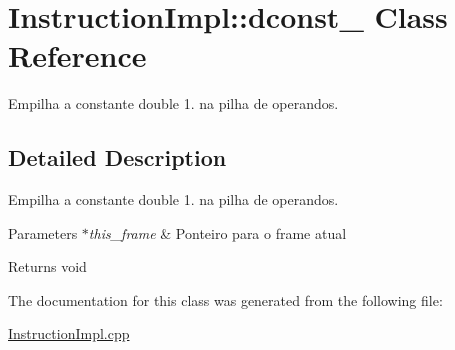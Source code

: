\hypertarget{class_instruction_impl_1_1dconst__1}{}\section{Instruction\+Impl\+:\+:dconst\+\_ Class Reference}
\label{class_instruction_impl_1_1dconst__1}


Empilha a constante double 1. na pilha de operandos.  




\subsection{Detailed Description}
Empilha a constante double 1. na pilha de operandos. 


\begin{DoxyParams}{Parameters}
{\em $\ast$this\+\_\+frame} & Ponteiro para o frame atual \\
\hline
\end{DoxyParams}
\begin{DoxyReturn}{Returns}
void 
\end{DoxyReturn}


The documentation for this class was generated from the following file\+:\begin{DoxyCompactItemize}
\item 
\hyperlink{_instruction_impl_8cpp}{Instruction\+Impl.\+cpp}\end{DoxyCompactItemize}
